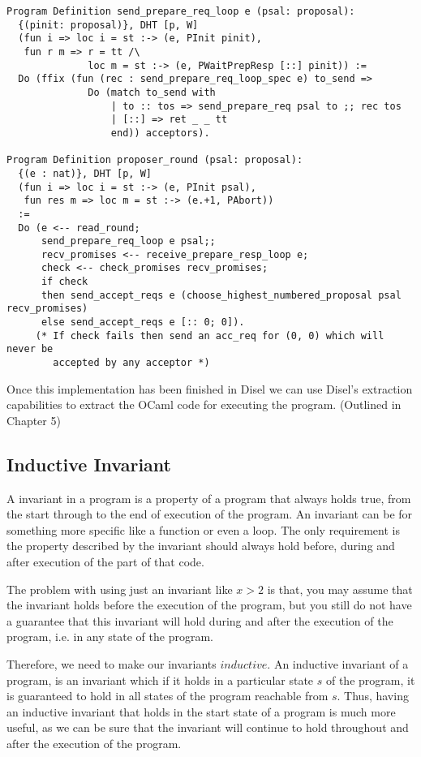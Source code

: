 \begin{lstlisting}
Program Definition send_prepare_req_loop e (psal: proposal):
  {(pinit: proposal)}, DHT [p, W]
  (fun i => loc i = st :-> (e, PInit pinit),
   fun r m => r = tt /\
              loc m = st :-> (e, PWaitPrepResp [::] pinit)) :=
  Do (ffix (fun (rec : send_prepare_req_loop_spec e) to_send =>
              Do (match to_send with
                  | to :: tos => send_prepare_req psal to ;; rec tos
                  | [::] => ret _ _ tt
                  end)) acceptors).

Program Definition proposer_round (psal: proposal):
  {(e : nat)}, DHT [p, W]
  (fun i => loc i = st :-> (e, PInit psal),
   fun res m => loc m = st :-> (e.+1, PAbort))
  :=
  Do (e <-- read_round;
      send_prepare_req_loop e psal;;
      recv_promises <-- receive_prepare_resp_loop e;
      check <-- check_promises recv_promises;
      if check
      then send_accept_reqs e (choose_highest_numbered_proposal psal recv_promises)
      else send_accept_reqs e [:: 0; 0]).
     (* If check fails then send an acc_req for (0, 0) which will never be
        accepted by any acceptor *)
\end{lstlisting}

Once this implementation has been finished in Disel we can use Disel's extraction
capabilities to extract the OCaml code for executing the program. (Outlined in Chapter 5)

\subsection{Inductive Invariant}
A invariant in a program is a property of a program that always holds true,
from the start through to the end of execution of the program. An invariant can be for something
more specific like a function or even a loop. The only requirement is the property
described by the invariant should always hold before, during and after execution
of the part of that code.

The problem with using just an invariant like $x > 2$ is that, you may assume
that the invariant holds before the execution of the program, but you still
do not have a guarantee that this invariant will hold during and after the
execution of the program, i.e. in any state of the program.

Therefore, we need to make our invariants $inductive$. An inductive invariant
of a program, is an invariant which if it holds in a particular state $s$ of the
program, it is guaranteed to hold in all states of the program reachable from $s$.
Thus, having an inductive invariant that holds in the start state of a program
is much more useful, as we can be sure that the invariant will continue to
hold throughout and after the execution of the program.

